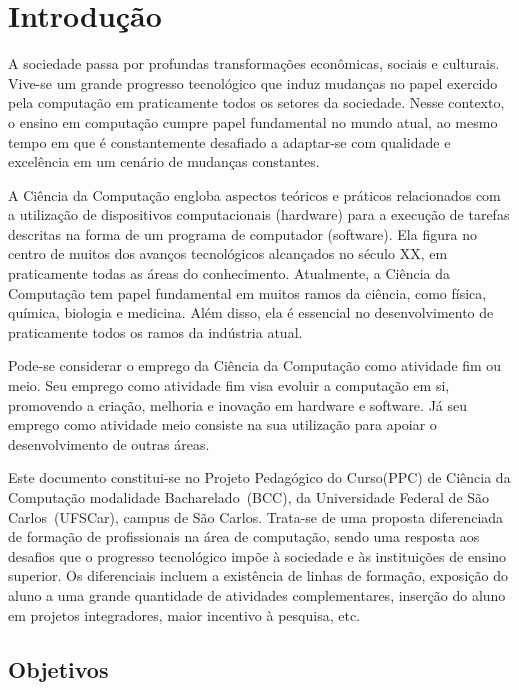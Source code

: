 \chapter{Introdução}
\label{chap:intro}

A sociedade passa por profundas transformações econômicas, sociais e culturais. Vive-se um grande progresso tecnológico que induz mudanças no papel exercido pela computação em praticamente todos os setores da sociedade. Nesse contexto, o ensino em computação cumpre papel fundamental no mundo atual, ao mesmo tempo em que é constantemente desafiado a adaptar-se com qualidade e excelência em um cenário de mudanças constantes.

A Ciência da Computação engloba aspectos teóricos e práticos relacionados com a utilização de dispositivos computacionais (hardware) para a execução de tarefas descritas na forma de um programa de computador (software). Ela figura no centro de muitos dos avanços tecnológicos alcançados no século XX, em praticamente todas as áreas do conhecimento. Atualmente, a Ciência da Computação tem papel fundamental em muitos ramos da ciência, como física, química, biologia e medicina. Além disso, ela é essencial no desenvolvimento de praticamente todos os ramos da indústria atual.

Pode-se considerar o emprego da Ciência da Computação como atividade fim ou meio. Seu emprego como atividade fim visa evoluir a computação em si, promovendo a criação, melhoria e inovação em hardware e software. Já seu emprego como atividade meio consiste na sua utilização para apoiar o desenvolvimento de outras áreas.

Este documento constitui-se no Projeto Pedagógico do Curso(PPC) de Ciência da Computação modalidade Bacharelado~(BCC), da Universidade Federal de São Carlos~(UFSCar), campus de São Carlos. Trata-se de uma proposta diferenciada de formação de profissionais na área de computação, sendo uma resposta aos desafios que o progresso tecnológico impõe à sociedade e às instituições de ensino superior. Os diferenciais incluem a existência de linhas de formação, exposição do aluno a uma grande quantidade de atividades complementares, inserção do aluno em projetos integradores, maior incentivo à pesquisa, etc. 



\section{Objetivos}
\label{sec:objetivos}

